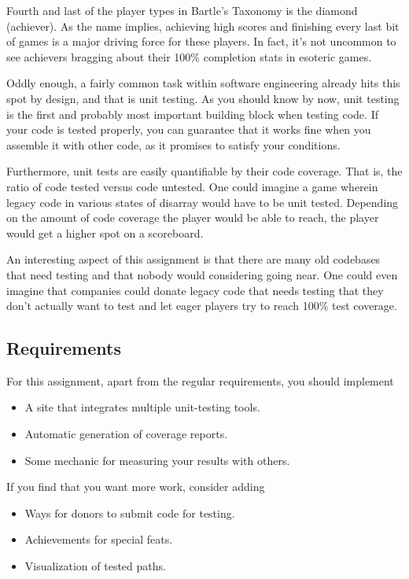 \begin{refsection}
    Fourth and last of the player types in Bartle's Taxonomy is the diamond (achiever). As the name implies, achieving high scores and finishing every last bit of games is a major driving force for these players. In fact, it's not uncommon to see achievers bragging about their 100\% completion stats in esoteric games.

    Oddly enough, a fairly common task within software engineering already hits this spot by design, and that is unit testing. As you should know by now, unit testing is the first and probably most important building block when testing code. If your code is tested properly, you can guarantee that it works fine when you assemble it with other code, as it promises to satisfy your conditions.

    Furthermore, unit tests are easily quantifiable by their code coverage. That is, the ratio of code tested versus code untested. One could imagine a game wherein legacy code in various states of disarray would have to be unit tested. Depending on the amount of code coverage the player would be able to reach, the player would get a higher spot on a scoreboard.

    An interesting aspect of this assignment is that there are many old codebases that need testing and that nobody would considering going near. One could even imagine that companies could donate legacy code that needs testing that they don't actually want to test and let eager players try to reach 100\% test coverage.

    \subsection*{Requirements}
    For this assignment, apart from the regular requirements, you should implement
    \begin{itemize}
        \item A site that integrates multiple unit-testing tools.
        \item Automatic generation of coverage reports.
        \item Some mechanic for measuring your results with others.
    \end{itemize}
    If you find that you want more work, consider adding
    \begin{itemize}
        \item Ways for donors to submit code for testing.
        \item Achievements for special feats.
        \item Visualization of tested paths.
    \end{itemize}

\printbibliography[heading=subbibliography]
\end{refsection}
